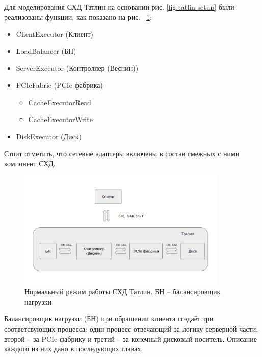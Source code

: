 Для моделирования СХД Татлин на основании рис. \ref{fig:tatlin-setup} были реализованы функции, как показано на рис.  ~\ref{fig:norm-tatlin}:

\begin{itemize}
\item ClientExecutor (Клиент) 
\item LoadBalancer (БН)
\item ServerExecutor (Контроллер (Веснин))
\item PCIeFabric (PCIe фабрика)
\begin{itemize}
\item CacheExecutorRead
\item CacheExecutorWrite
\end{itemize}
\item DiskExecutor (Диск)
\end{itemize}

Стоит отметить, что сетевые адаптеры включены в состав смежных с ними компонент СХД.

\begin{figure}[!ht]
\centering
\includegraphics[width=10cm]{Kenenbek/images/norm.png}
\caption{Нормальный режим работы СХД Татлин. БН -- балансировщик нагрузки}
\label{fig:norm-tatlin}
\end{figure}

\par 
Балансировщик нагрузки (БН) при обращении клиента создаёт три соответсвующих процесса: один процесс отвечающий за логику серверной части, второй -- за PCIe фабрику и третий -- за конечный дисковый носитель. Описание каждого из них дано в последующих главах.

\par 

